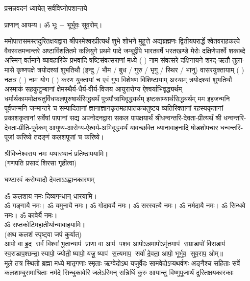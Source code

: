 {प्रसन्नवदनं ध्यायेत् सर्वविघ्नोपशान्तये}
 
प्राणान्  आयम्य।  ॐ भूः + भूर्भुवः॒ सुव॒रोम्।


ममोपात्तसमस्तदुरितक्षयद्वारा श्रीपरमेश्वरप्रीत्यर्थं शुभे शोभने मुहूत्ते अद्यब्रह्मणः
द्वितीयपरार्द्धे श्वेतवराहकल्पे वैवस्वतमन्वन्तरे अष्टाविंशतितमे कलियुगे प्रथमे पादे
जम्बूद्वीपे भारतवर्षे भरतखण्डे मेरोः दक्षिणेपार्श्वे शकाब्दे अस्मिन् वर्तमाने व्यावहारिके
 प्रभवादि षष्टिसंवत्सराणां मध्ये (  ) नाम संवत्सरे दक्षिनायने 
शरद्-ऋतौ  तुला-मासे कृष्णपक्षे त्रयोदश्यां शुभतिथौ
(इन्दु / भौम / बुध / गुरु / भृगु / स्थिर / भानु) वासरयुक्तायाम्
(  ) नक्षत्र (  ) नाम  योग  (  ) करण युक्तायां च एवं गुण विशेषण विशिष्टायाम्
अस्याम् त्रयोदश्यां शुभतिथौ 
अस्माकं सहकुटुम्बानां क्षेमस्थैर्य-धैर्य-वीर्य-विजय आयुरारोग्य ऐश्वर्याभिवृद्ध्यर्थम्
 धर्मार्थकाममोक्ष\-चतुर्विधफलपुरुषार्थसिद्ध्यर्थं पुत्रपौत्राभि\-वृद्ध्यर्थम् इष्टकाम्यार्थसिद्ध्यर्थम्
मम इहजन्मनि पूर्वजन्मनि जन्मान्तरे च सम्पादितानां ज्ञानाज्ञानकृतमहा\-पातकचतुष्टय
व्यतिरिक्तानां रहस्यकृतानां प्रकाशकृतानां सर्वेषां पापानां सद्य अपनोदनद्वारा सकल 
पापक्षयार्थं
श्रीधन्वन्तरि-देवता-प्रीत्यर्थं श्री धन्वन्तरि-देवता-प्रीति-पूर्वकम् आयुष्य-आरोग्य-ऐश्वर्य-अभिवृद्ध्यर्थं 
यावच्छक्ति ध्यानावाहनादि 
षोडशोपचार धन्वन्तरि-पूजां करिष्ये तदङ्गं कलशपूजां च करिष्ये।


श्रीविघ्नेश्वराय नमः यथास्थानं प्रतिष्ठापयामि।\\
(गणपति प्रसादं शिरसा गृहीत्वा)


{घण्टारवं करोम्यादौ देवताऽऽह्वानकारणम्}

ॐ कलशाय नमः दिव्यगन्धान् धारयामि।\\
ॐ गङ्गायै नमः। ॐ यमुनायै नमः। ॐ गोदावर्यै नमः।  ॐ सरस्वत्यै नमः। ॐ नर्मदायै नमः। ॐ सिन्धवे नमः। ॐ कावेर्यै नमः।\\
 ॐ सप्तकोटिमहातीर्थान्यावाहयामि। \\

(अथ कलशं स्पृष्ट्वा जपं कुर्यात्) \\
आपो॒ वा इ॒द सर्वं॒ विश्वा॑ भू॒तान्याप॑ प्रा॒णा वा आप॑ प॒शव॒ आपो\-ऽन्न॒मापोऽमृ॑त॒माप॑ स॒म्राडापो॑ वि॒राडाप॑ स्व॒राडाप॒श्\-छन्दा॒स्यापो॒ ज्योती॒ष्यापो॒ यजू॒ष्याप॑ स॒त्यमाप॒ सर्वा॑ दे॒वता॒ आपो॒ भूर्भुव॒ सुव॒राप॒ ओम्॥\\

{मूले तत्र स्थितो ब्रह्मा मध्ये मातृगणाः स्मृताः}
{ऋग्वेदोऽथ यजुर्वेदः सामवेदोऽप्यथर्वणः}
{अङ्गैश्च सहिताः सर्वे कलशाम्बुसमाश्रिताः}
{नर्मदे सिन्धुकावेरि जलेऽस्मिन् सन्निधिं कुरु}
{आयान्तु विष्णुपूजार्थं दुरितक्षयकारकाः}

